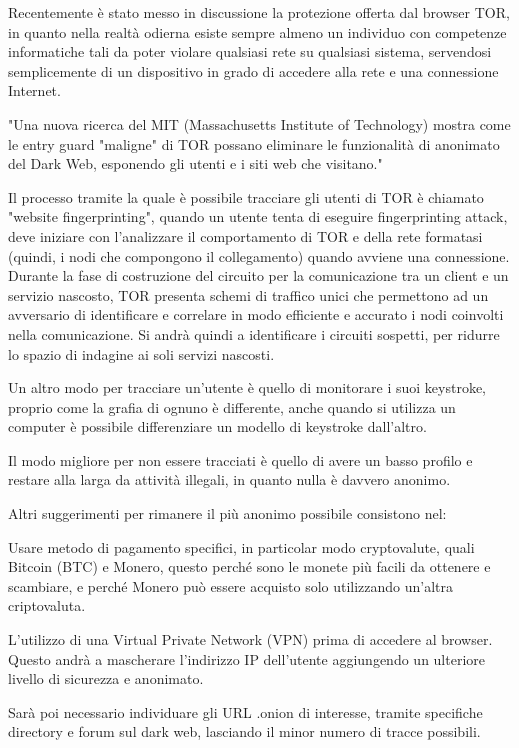 Recentemente è stato messo in discussione la protezione offerta dal browser TOR, in quanto nella realtà odierna esiste sempre almeno un individuo con competenze informatiche tali da poter violare qualsiasi rete su qualsiasi sistema, servendosi semplicemente di un dispositivo in grado di accedere alla rete e una connessione Internet.

"Una nuova ricerca del MIT (Massachusetts Institute of Technology) mostra come le entry guard "maligne" di TOR possano eliminare le funzionalità di anonimato del Dark Web, esponendo gli utenti e i siti web che visitano."

Il processo tramite la quale è possibile tracciare gli utenti di TOR è chiamato "website fingerprinting", quando un utente tenta di eseguire fingerprinting attack, deve iniziare con l'analizzare il comportamento di TOR  e della rete formatasi (quindi, i nodi che compongono il collegamento) quando avviene una connessione. Durante la fase di costruzione del circuito per la comunicazione tra un client e un servizio nascosto, TOR presenta schemi di traffico unici che permettono ad un avversario di identificare e correlare in modo efficiente e accurato i nodi coinvolti nella comunicazione.
Si andrà quindi a identificare i circuiti sospetti, per ridurre lo spazio di indagine ai soli servizi nascosti.

Un altro modo per tracciare un'utente è quello di monitorare i suoi keystroke, proprio come la grafia di ognuno è differente, anche quando si utilizza un computer è possibile differenziare un modello di keystroke dall'altro.

Il modo migliore per non essere tracciati è quello di avere un basso profilo e restare alla larga da attività illegali, in quanto nulla è davvero anonimo.

\newpage

Altri suggerimenti per rimanere il più anonimo possibile consistono nel:

Usare metodo di pagamento specifici, in particolar modo cryptovalute, quali Bitcoin (BTC) e Monero, questo perché sono le monete più facili da ottenere e scambiare, e perché Monero può essere acquisto solo utilizzando un'altra criptovaluta. 

L'utilizzo di una Virtual Private Network (VPN) prima di accedere al browser. Questo andrà a mascherare l'indirizzo IP dell'utente aggiungendo un ulteriore livello di sicurezza e anonimato.

Sarà poi necessario individuare gli URL .onion di interesse, tramite specifiche directory e forum sul dark web, lasciando il minor numero di tracce possibili.

